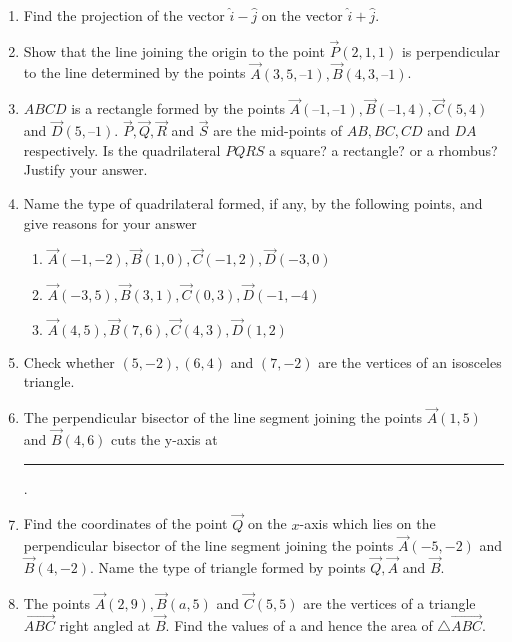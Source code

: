 \begin{enumerate}[label=\thesubsection.\arabic*, ref=\thesubsection.\theenumi]
	\\
	\solution
		
\item Find the projection of the vector $\hat{i}-\hat{j}$ on the vector $\hat{i}+\hat{j}$.
	\\
\solution
		
		\item 
 Show that the line joining the origin to the point $\vec{P}(2,  1,  1)$ is perpendicular to the
line determined by the points $\vec{A}(3,  5,  – 1),  \vec{B}(4,  3,  – 1)$.
\\
    \solution
		
\item $ABCD$ is a rectangle formed by the points $\vec{A}(–1,  –1),  \vec{B}(– 1,  4),  \vec{C}(5,  4)$  and  $\vec{D}(5,  – 1)$. $\vec{P},  \vec{Q},  \vec{R}$ and $\vec{S}$ are the mid-points of $AB,  BC,  CD$ and $DA$ respectively. Is the quadrilateral $PQRS$ a square? a rectangle? or a rhombus? Justify your answer.
	\\
	
\item Name the type of quadrilateral formed,  if any,  by the following points, and give reasons for your answer
\begin{enumerate}
\item $\vec{A}(-1, -2),  \vec{B}(1, 0),  \vec{C}(-1, 2),  \vec{D}(-3, 0)$
\item $\vec{A}(-3, 5),  \vec{B}(3, 1),  \vec{C}(0, 3),  \vec{D}(-1, -4)$
\item $\vec{A}(4, 5),  \vec{B}(7, 6),  \vec{C}(4, 3),  \vec{D}(1, 2)$
\end{enumerate}
\solution
		
\item Check whether $(5, -2),  (6, 4)$ and $(7, -2)$ are the vertices of an isosceles triangle.
\item The perpendicular bisector of the line segment joining the points $\vec{A} (1,  5) $ and $
\vec{B} (4,  6)$ cuts the y-axis at \rule{1cm}{0.1pt}.
\item Find the coordinates of the point $\vec{Q}$ on the $x$-axis which lies on the perpendicular bisector of the line segment joining the points $\vec{A}(-5, -2) $ and $ \vec{B}(4, -2)$. Name the type of triangle formed by points $\vec{Q}, \vec{A}$ and $\vec{B}$.
\item The points $\vec{A}(2, 9), \vec{B}(a, 5) $ and $\vec{C}(5, 5)$ are the vertices of a triangle $\vec{ABC}$ right angled at $\vec{B}$. Find the values of a and hence the area of $\triangle \vec{ABC}$.

\end{enumerate}
